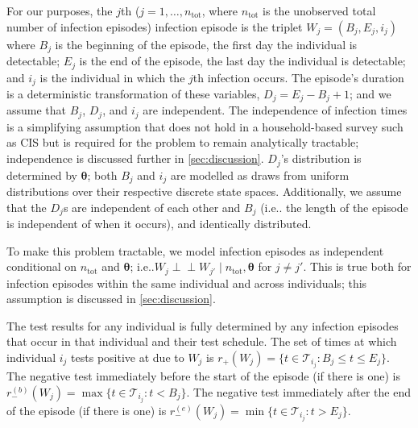 \documentclass[12pt]{article}
\makeatletter
\newcommand{\ind}{\mathrel{\perp\!\!\!\perp}}
\renewcommand{\vec}[1]{\bm{#1}}
\newcommand{\ssep}{:}
\newcommand{\ntot}{n_\text{tot}}
\newcommand{\sched}{\mathcal{T}}
\newcommand{\posResults}{r_{+}}
\newcommand{\negResults}{r_{-}}
\DeclareRobustCommand\onedot{\futurelet\@let@token\@onedot}
\def\@onedot{\ifx\@let@token.\else.\null\fi\xspace}
\def\ie{i.e\onedot} \def\Ie{{I.e}\onedot}
\makeatother
\begin{document}
For our purposes, the $j$th ($j = 1, \dots, \ntot$, where $\ntot$ is the unobserved total number of infection episodes) infection episode is the triplet $W_j = (B_j, E_j, i_j)$ where $B_j$ is the beginning of the episode, the first day the individual is detectable; $E_j$ is the end of the episode, the last day the individual is detectable; and $i_j$ is the individual in which the $j$th infection occurs.
The episode's duration is a deterministic transformation of these variables, $D_j = E_j - B_j + 1$; and we assume that $B_j$, $D_j$, and $i_j$ are independent.
The independence of infection times is a simplifying assumption that does not hold in a household-based survey such as CIS but is required for the problem to remain analytically tractable; independence is discussed further in \cref{sec:discussion}.
$D_j$'s distribution is determined by $\vec{\theta}$; both $B_j$ and $i_j$ are modelled as draws from uniform distributions over their respective discrete state spaces.
Additionally, we assume that the $D_j$s are independent of each other and $B_j$ (\ie the length of the episode is independent of when it occurs), and identically distributed.


To make this problem tractable, we model infection episodes as independent conditional on $\ntot$ and $\vec{\theta}$; \ie $W_j \ind W_{j'} \mid \ntot, \vec{\theta}$ for $j \neq j'$.
This is true both for infection episodes within the same individual and across individuals; this assumption is discussed in \cref{sec:discussion}.

The test results for any individual is fully determined by any infection episodes that occur in that individual and their test schedule.
The set of times at which individual $i_j$ tests positive at due to $W_j$ is $\posResults(W_j) = \{ t \in \sched_{i_j} \ssep B_j \leq t \leq E_j \}$.
The negative test immediately before the start of the episode (if there is one) is $\negResults^{(b)}(W_j) = \max \{ t \in \sched_{i_j} \ssep t < B_j \}$.
The negative test immediately after the end of the episode (if there is one) is $\negResults^{(e)}(W_j) = \min \{ t \in \sched_{i_j} \ssep t > E_j \}$.
\end{document}
